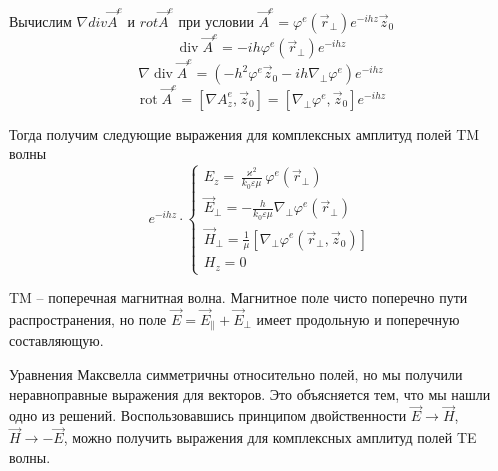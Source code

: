 \documentclass[a4paper,14pt]{extarticle}
\DeclareMathOperator{\Div}{div}
\DeclareMathOperator{\Rot}{rot}
\renewcommand{\phi}{\varphi}
\renewcommand{\epsilon}{\varepsilon}
\renewcommand{\kappa}{\varkappa}
\begin{document}
	Вычислим $\nabla div \vec{A}^e$ и $rot \vec{A}^e$ при условии $\vec{A}^e = \phi^e(\vec{r}_\perp)e^{-ihz}\vec{z}_0$
\begin{equation}
	\Div \vec{A}^e = -ih\phi^e(\vec{r}_\perp)e^{-ihz}
\end{equation}
\begin{equation}
	\nabla \Div \vec{A}^e = (-h^2\phi^e\vec{z}_0-ih\nabla_\perp\phi^e)e^{-ihz}
\end{equation}
\begin{equation}
	\Rot \vec{A}^e = [\nabla A^e_z,\vec{z}_0] = [\nabla_\perp\phi^e,\vec{z}_0]e^{-ihz}
\end{equation}
	
Тогда получим следующие выражения для комплексных амплитуд полей TM волны 
\begin{equation}
	e^{-ihz}\cdot\left\{
	\begin{aligned}
		E_z = \frac{\kappa^2}{k_0\epsilon\mu}\phi^e(\vec{r}_\perp)\\
		\vec{E}_\perp = -\frac{h}{k_0\epsilon\mu}\nabla_\perp\phi^e(\vec{r}_\perp)\\
		\vec{H}_\perp = \frac{1}{\mu}[\nabla_\perp\phi^e(\vec{r}_\perp,\vec{z}_0)]\\
		H_z = 0
	\end{aligned}\right.
\end{equation}


TM -- поперечная магнитная волна. Магнитное поле чисто поперечно пути распространения, но поле $\vec{E}=\vec{E}_\parallel+\vec{E}_\perp$ имеет продольную и поперечную составляющую.

Уравнения Максвелла симметричны относительно полей, но мы получили неравноправные выражения для векторов. Это объясняется тем, что мы нашли одно из решений. Воспользовавшись принципом двойственности $\vec{E}\to\vec{H}$, $\vec{H}\to -\vec{E}$, можно получить выражения  для комплексных амплитуд полей TE волны. 
\end{document}
